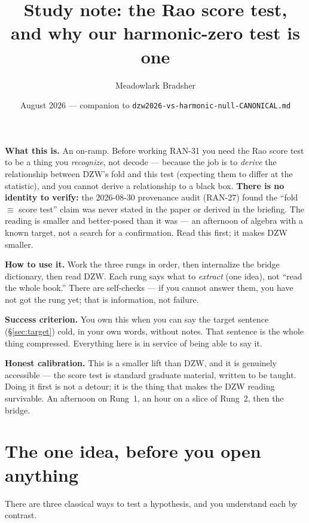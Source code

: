 \documentclass[11pt,a4paper]{article}
\title{Study note: the Rao score test,\\
and why our harmonic-zero test is one}
\author{Meadowlark Bradsher}
\date{August 2026 --- companion to \texttt{dzw2026-vs-harmonic-null-CANONICAL.md}}
\theoremstyle{definition}
\begin{document}
\maketitle

\begin{mdframed}[style=callout]
\noindent\textbf{What this is.} An on-ramp. Before working RAN-31 you need the
Rao score test to be a thing you \emph{recognize}, not decode --- because the job
is to \emph{derive} the relationship between DZW's fold and this test (expecting
them to differ at the statistic), and you cannot derive a relationship to a black
box. \textbf{There is no identity to verify:} the 2026-08-30 provenance audit
(RAN-27) found the ``fold $\equiv$ score test'' claim was never stated in the
paper or derived in the briefing. The reading is smaller and better-posed than it
was --- an afternoon of algebra with a known target, not a search for a
confirmation. Read this first; it makes DZW smaller.

\smallskip
\noindent\textbf{How to use it.} Work the three rungs in order, then internalize
the bridge dictionary, then read DZW. Each rung says what to \emph{extract} (one
idea), not ``read the whole book.'' There are self-checks --- if you cannot
answer them, you have not got the rung yet; that is information, not failure.

\smallskip
\noindent\textbf{Success criterion.} You own this when you can say the target
sentence (\S\ref{sec:target}) cold, in your own words, without notes. That
sentence is the whole thing compressed. Everything here is in service of being
able to say it.

\smallskip
\noindent\textbf{Honest calibration.} This is a smaller lift than DZW, and it is
genuinely accessible --- the score test is standard graduate material, written to
be taught. Doing it first is not a detour; it is the thing that makes the DZW
reading survivable. An afternoon on Rung~1, an hour on a slice of Rung~2, then
the bridge.
\end{mdframed}

\section{The one idea, before you open anything}

There are three classical ways to test a hypothesis, and you understand each by
contrast.
\end{document}
